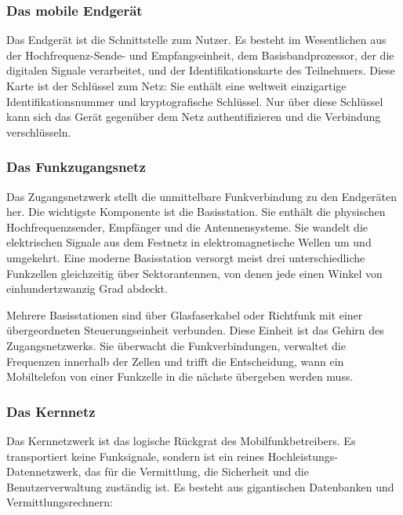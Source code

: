 \documentclass[11pt,a4paper]{article}
\begin{document}
\subsubsection{Das mobile Endgerät}
Das Endgerät ist die Schnittstelle zum Nutzer. Es besteht im Wesentlichen aus der Hochfrequenz-Sende- und Empfangseinheit, dem Basisbandprozessor, der die digitalen Signale verarbeitet, und der Identifikationskarte des Teilnehmers. Diese Karte ist der Schlüssel zum Netz: Sie enthält eine weltweit einzigartige Identifikationsnummer und kryptografische Schlüssel. Nur über diese Schlüssel kann sich das Gerät gegenüber dem Netz authentifizieren und die Verbindung verschlüsseln.

\subsubsection{Das Funkzugangsnetz}
Das Zugangsnetzwerk stellt die unmittelbare Funkverbindung zu den Endgeräten her. Die wichtigste Komponente ist die Basisstation. Sie enthält die physischen Hochfrequenzsender, Empfänger und die Antennensysteme. Sie wandelt die elektrischen Signale aus dem Festnetz in elektromagnetische Wellen um und umgekehrt. Eine moderne Basisstation versorgt meist drei unterschiedliche Funkzellen gleichzeitig über Sektorantennen, von denen jede einen Winkel von einhundertzwanzig Grad abdeckt.

Mehrere Basisstationen sind über Glasfaserkabel oder Richtfunk mit einer übergeordneten Steuerungseinheit verbunden. Diese Einheit ist das Gehirn des Zugangsnetzwerks. Sie überwacht die Funkverbindungen, verwaltet die Frequenzen innerhalb der Zellen und trifft die Entscheidung, wann ein Mobiltelefon von einer Funkzelle in die nächste übergeben werden muss.

\subsubsection{Das Kernnetz}
Das Kernnetzwerk ist das logische Rückgrat des Mobilfunkbetreibers. Es transportiert keine Funksignale, sondern ist ein reines Hochleistungs-Datennetzwerk, das für die Vermittlung, die Sicherheit und die Benutzerverwaltung zuständig ist. Es besteht aus gigantischen Datenbanken und Vermittlungsrechnern:
\end{document}
